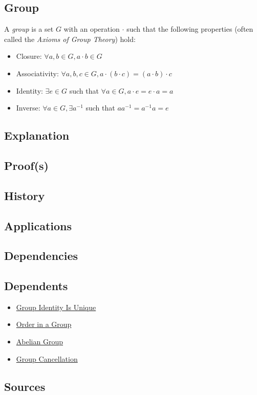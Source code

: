 \subsection{Group}\label{articles:algebra:group-theory:group}

A \textit{group} is a set $G$ with an operation $\cdot$ such that the following properties (often called the \textit{Axioms of Group Theory}) hold:

\begin{itemize}
\item Closure: $\forall a, b \in G, a \cdot b \in G$
\item Associativity: $\forall a, b, c \in G, a \cdot (b \cdot c) = (a \cdot b) \cdot c$
\item Identity: $\exists e \in G$ such that $\forall a \in G, a \cdot e = e \cdot a = a$
\item Inverse: $\forall a \in G, \exists a^{-1}$ such that $a a^{-1} = a^{-1} a = e$
\end{itemize}

\subsection{Explanation}

\subsection{Proof(s)}

\subsection{History}

\subsection{Applications}

\subsection{Dependencies}
\subsection{Dependents}
\begin{itemize}
\item \hyperref[articles:algebra:group-theory:group-identity-is-unique]{Group Identity Is Unique}
\item \hyperref[articles:algebra:group-theory:order-in-a-group]{Order in a Group}
\item \hyperref[articles:algebra:group-theory:abelian-group]{Abelian Group}
\item \hyperref[articles:algebra:group-theory:group-cancellation]{Group Cancellation}
\end{itemize}

\subsection{Sources}
